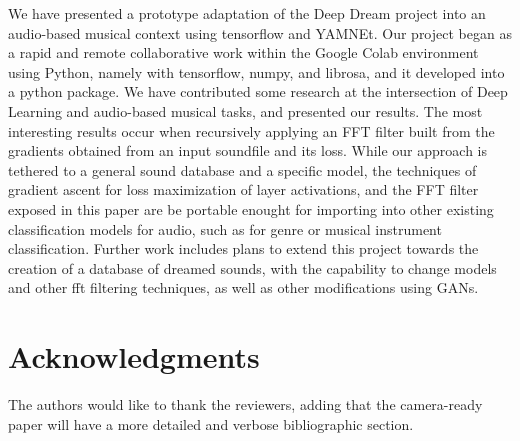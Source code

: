 \documentclass[a4paper,10pt,oneside]{article}
\begin{document}
\begin{sloppy}
 
We have presented a prototype adaptation of the Deep Dream project into an audio-based musical context using tensorflow and YAMNEt. Our project began as a rapid and remote collaborative work within the Google Colab environment using Python, namely with tensorflow, numpy, and librosa, and it developed into a python package. We have contributed some research at the intersection of Deep Learning and audio-based musical tasks, and presented our results. The most interesting results occur when recursively applying an FFT filter built from the gradients obtained from an input soundfile and its loss. While our approach is tethered to a general sound database and a specific model, the techniques of gradient ascent for loss maximization of layer activations, and the FFT filter exposed in this paper are be portable enought for importing into other existing classification models for audio, such as for genre or musical instrument classification. Further work includes plans to extend this project towards the creation of a database of dreamed sounds, with the capability to change models and other fft filtering techniques, as well as other modifications using GANs.

\section{Acknowledgments}
The authors would like to thank the reviewers, adding that the camera-ready paper will have a more detailed and verbose bibliographic section.




\end{sloppy}
\end{document}
